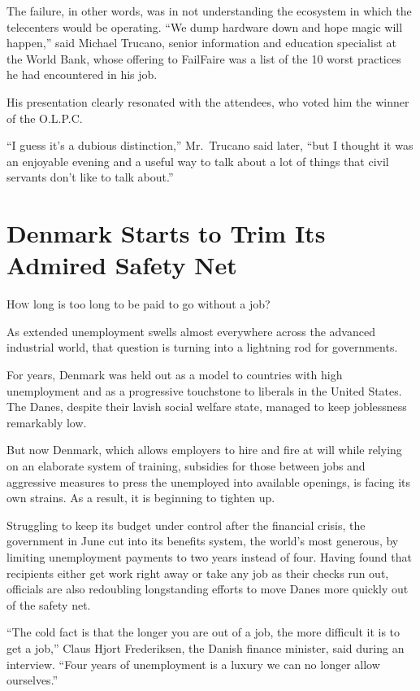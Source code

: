 ﻿\documentclass[12pt]{article}
\begin{document}
The failure, in other words, was in not understanding the ecosystem in which the telecenters would
be operating. ``We dump hardware down and hope magic will happen,'' said Michael Trucano, senior
information and education specialist at the World Bank, whose offering to FailFaire was a list of
the 10 worst practices he had encountered in his job.

His presentation clearly resonated with the attendees, who voted him the winner of the O.L.P.C.

``I guess it's a dubious distinction,'' Mr.~Trucano said later, ``but I thought it was an enjoyable
evening and a useful way to talk about a lot of things that civil servants don't like to talk
about.''

\section{Denmark Starts to Trim Its Admired Safety Net}

\lettrine{H}{ow} long is too long to be paid to go without a job?

As extended unemployment swells almost everywhere across the advanced industrial world, that
question is turning into a lightning rod for governments.

For years, Denmark was held out as a model to countries with high unemployment and as a progressive
touchstone to liberals in the United States. The Danes, despite their lavish social welfare state,
managed to keep joblessness remarkably low.

But now Denmark, which allows employers to hire and fire at will while relying on an elaborate
system of training, subsidies for those between jobs and aggressive measures to press the unemployed
into available openings, is facing its own strains. As a result, it is beginning to tighten up.

Struggling to keep its budget under control after the financial crisis, the government in June cut
into its benefits system, the world's most generous, by limiting unemployment payments to two years
instead of four. Having found that recipients either get work right away or take any job as their
checks run out, officials are also redoubling longstanding efforts to move Danes more quickly out of
the safety net.

``The cold fact is that the longer you are out of a job, the more difficult it is to get a job,''
Claus Hjort Frederiksen, the Danish finance minister, said during an interview. ``Four years of
unemployment is a luxury we can no longer allow ourselves.''
\end{document}

